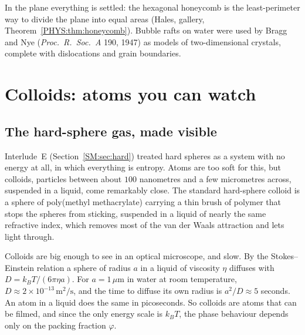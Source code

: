 In the plane everything is settled: the hexagonal honeycomb is the least-perimeter way to divide the
plane into equal areas (Hales, gallery, Theorem~\ref{PHYS:thm:honeycomb}). Bubble rafts on water were
used by Bragg and Nye (\emph{Proc.\ R.\ Soc.\ A} 190, 1947) as models of two-dimensional crystals, complete with
dislocations and grain boundaries.

\section{Colloids: atoms you can watch}
\label{PHYS:sec:colloids}

\subsection*{The hard-sphere gas, made visible}
Interlude~E (Section~\ref{SM:sec:hard}) treated hard spheres as a system with no energy at all, in which
everything is entropy. Atoms are too soft for this, but colloids, particles between about
$100$ nanometres and a few micrometres across, suspended in a liquid, come remarkably close. The standard
hard-sphere colloid is a sphere of poly(methyl methacrylate) carrying a thin brush of polymer that
stops the spheres from sticking, suspended in a liquid of nearly the same refractive index, which
removes most of the van der Waals attraction and lets light through.

Colloids are big enough to see in an optical microscope, and slow. By the Stokes--Einstein relation a sphere of radius $a$ in a liquid of viscosity $\eta$ diffuses
with $D=k_BT/(6\pi\eta a)$. For $a=1\,\mu$m in water at room temperature,
$D\approx2\times10^{-13}\,\mathrm m^2/\mathrm s$, and the time to diffuse its own radius is $a^2/D\approx5$
seconds. An atom in a liquid does the same in picoseconds. So colloids are atoms that can be filmed, and since
the only energy scale is $k_BT$, the phase behaviour depends only on the packing fraction $\varphi$.

